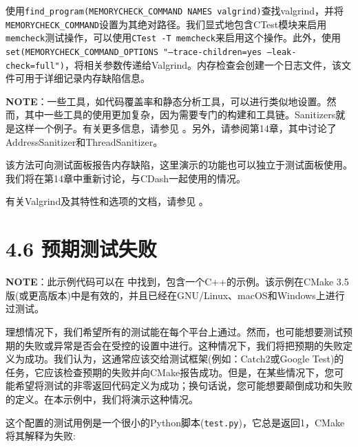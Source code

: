 
使用\texttt{find\_program(MEMORYCHECK\_COMMAND NAMES valgrind)}查找valgrind，并将\texttt{MEMORYCHECK\_COMMAND}设置为其绝对路径。我们显式地包含CTest模块来启用\texttt{memcheck}测试操作，可以使用\texttt{CTest -T memcheck}来启用这个操作。此外，使用\texttt{set(MEMORYCHECK\_COMMAND\_OPTIONS "--trace-children=yes --leak-check=full")}，将相关参数传递给Valgrind。内存检查会创建一个日志文件，该文件可用于详细记录内存缺陷信息。

\begin{myInfoBox}
\textbf{NOTE}：一些工具，如代码覆盖率和静态分析工具，可以进行类似地设置。然而，其中一些工具的使用更加复杂，因为需要专门的构建和工具链。Sanitizers就是这样一个例子。有关更多信息，请参见 。另外，请参阅第14章，其中讨论了AddressSanitizer和ThreadSanitizer。
\end{myInfoBox}


该方法可向测试面板报告内存缺陷，这里演示的功能也可以独立于测试面板使用。我们将在第14章中重新讨论，与CDash一起使用的情况。

有关Valgrind及其特性和选项的文档，请参见 。


\section{4.6 预期测试失败}

\begin{myInfoBox}
\textbf{NOTE}：此示例代码可以在  中找到，包含一个C++的示例。该示例在CMake 3.5版(或更高版本)中是有效的，并且已经在GNU/Linux、macOS和Windows上进行过测试。
\end{myInfoBox}

理想情况下，我们希望所有的测试能在每个平台上通过。然而，也可能想要测试预期的失败或异常是否会在受控的设置中进行。这种情况下，我们将把预期的失败定义为成功。我们认为，这通常应该交给测试框架(例如：Catch2或Google Test)的任务，它应该检查预期的失败并向CMake报告成功。但是，在某些情况下，您可能希望将测试的非零返回代码定义为成功；换句话说，您可能想要颠倒成功和失败的定义。在本示例中，我们将演示这种情况。


这个配置的测试用例是一个很小的Python脚本(\texttt{test.py})，它总是返回1，CMake将其解释为失败:

